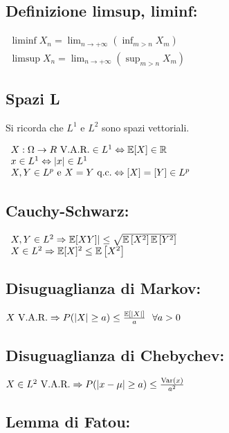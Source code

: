 \subsection{Definizione limsup, liminf:}

$ \begin{array}{l}
\liminf X_n =\lim_{n\rightarrow +\infty}(\inf_{m >n} X_m)\\
\limsup X_n =\lim_{n\rightarrow +\infty}\left(\sup_{m >n} X_m\right)
\end{array}$
\subsection{Spazi L}

Si ricorda che $L^1$ e $L^2$ sono spazi vettoriali.

$ \begin{array}{l}
X:\Omega \rightarrow R\ \text{V.A.R.} \in L^1 \Leftrightarrow \mathbb E[X]\in \mathbb R\\
x\in L^1 \Leftrightarrow | x| \in L^1\\
X,Y\in L^p \ \text{e} \ X=Y\ \text{q.c.} \Leftrightarrow [X]=[Y]\in L^p
\end{array}$
\subsection{Cauchy-Schwarz:}

$ \begin{array}{l}
X,Y\in L^2 \Rightarrow \mathbb E[XY]|\leq \sqrt{\mathbb E\left[ X^2\right]\mathbb E\left[ Y^2\right]}\\
X\in L^2 \Rightarrow \mathbb E[X]^2 \leq \mathbb E\left[ X^2\right]
\end{array}$
\subsection{Disuguaglianza di Markov:}

$X\ \text{V.A.R.} \Rightarrow P(|X|\geq a)\leq \frac{\mathbb E[|X|]}{a} \ \ \forall a >0$
\subsection{Disuguaglianza di Chebychev:}

$X\in L^2 \ \text{V.A.R.} \Rightarrow P(| x-\mu | \geq a)\leq \frac{\operatorname{Var}(x)}{a^2}$
\subsection{Lemma di Fatou:}

